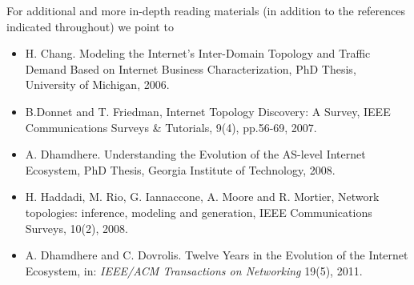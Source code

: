 For additional and more in-depth reading materials (in
addition to the references indicated throughout) we point to

\begin{itemize}

\item[\cite{chang-thesis06}] H. Chang. Modeling the Internet's
Inter-Domain Topology and Traffic Demand Based on Internet Business Characterization, PhD Thesis, University of Michigan, 2006.

\item[\cite{Donnet07}] B.Donnet and  T. Friedman, Internet Topology Discovery: A Survey, IEEE Communications Surveys \& Tutorials, 9(4), pp.56-69, 2007.

\item[\cite{dhamdhere-thesis08}] A. Dhamdhere. Understanding the
Evolution of the AS-level Internet Ecosystem, PhD Thesis, Georgia Institute of Technology, 2008.

\item[\cite{haddadi08:_networ_topol}] H. Haddadi, M. Rio,
G. Iannaccone, A. Moore and R. Mortier, Network topologies:
inference, modeling and generation, IEEE Communications Surveys,
10(2), 2008.

\item[\cite{dhamdhere11:_twelv_years_evolut_inter_ecosy}] A. Dhamdhere
  and C. Dovrolis. Twelve Years in the Evolution of the Internet
  Ecosystem, in: {\em IEEE/ACM Transactions on Networking} 19(5),
  2011.

\end{itemize}
